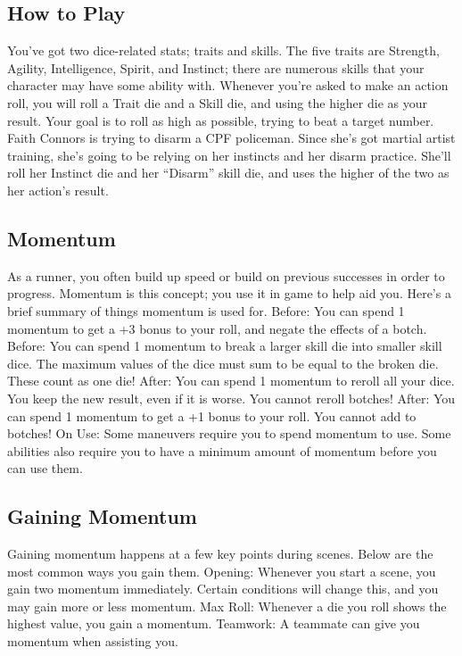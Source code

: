 \documentclass{article}
\begin{document}
\subsection{How to Play}
You’ve got two dice-related stats; traits and skills. The five traits are Strength, Agility, Intelligence, Spirit, and Instinct; there are numerous skills that your character may have some ability with.
Whenever you’re asked to make an action roll, you will roll a Trait die and a Skill die, and using the higher die as your result. Your goal is to roll as high as possible, trying to beat a target number.
Faith Connors is trying to disarm a CPF policeman. Since she’s got martial artist training, she’s going to be relying on her instincts and her disarm practice. She’ll roll her Instinct die and her “Disarm” skill die, and uses the higher of the two as her action’s result.
\subsection{Momentum}
As a runner, you often build up speed or build on previous successes in order to progress. Momentum is this concept; you use it in game to help aid you. Here’s a brief summary of things momentum is used for.
Before: You can spend 1 momentum to get a +3 bonus to your roll, and negate the effects of a botch.
Before: You can spend 1 momentum to break a larger skill die into smaller skill dice. The maximum values of the dice must sum to be equal to the broken die. These count as one die!
After: You can spend 1 momentum to reroll all your dice. You keep the new result, even if it is worse. You cannot reroll botches!
After: You can spend 1 momentum to get a +1 bonus to your roll. You cannot add to botches!
On Use: Some maneuvers require you to spend momentum to use. Some abilities also require you to have a minimum amount of momentum before you can use them.
\subsection{Gaining Momentum}
Gaining momentum happens at a few key points during scenes. Below are the most common ways you gain them.
Opening: Whenever you start a scene, you gain two momentum immediately. Certain conditions will change this, and you may gain more or less momentum.
Max Roll: Whenever a die you roll shows the highest value, you gain a momentum.
Teamwork: A teammate can give you momentum when assisting you.
\end{document}
